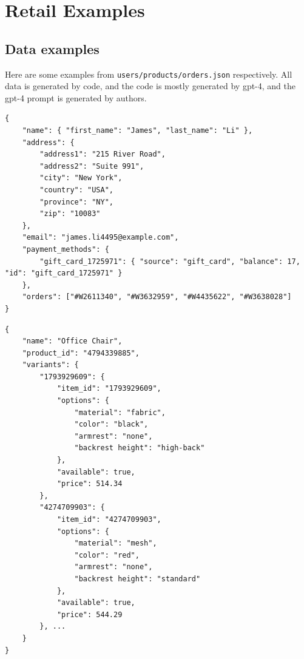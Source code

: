 \newpage 
\section{Retail Examples} \label{sec:retail_details}

\subsection{Data examples} \label{sec:retail_data}
Here are some examples from \texttt{users/products/orders.json} respectively. All data is generated by code, and the code is mostly generated by gpt-4, and the gpt-4 prompt is generated by authors. 

\begin{listing}[ht]
\begin{verbatim}
{
    "name": { "first_name": "James", "last_name": "Li" },
    "address": {
        "address1": "215 River Road",
        "address2": "Suite 991",
        "city": "New York",
        "country": "USA",
        "province": "NY",
        "zip": "10083"
    },
    "email": "james.li4495@example.com",
    "payment_methods": {
        "gift_card_1725971": { "source": "gift_card", "balance": 17, "id": "gift_card_1725971" }
    },
    "orders": ["#W2611340", "#W3632959", "#W4435622", "#W3638028"]
}
\end{verbatim}
\caption{An example entry from users database in \retail.}
\end{listing}




\begin{listing}[ht]
\begin{verbatim}
{
    "name": "Office Chair",
    "product_id": "4794339885",
    "variants": {
        "1793929609": {
            "item_id": "1793929609",
            "options": {
                "material": "fabric",
                "color": "black",
                "armrest": "none",
                "backrest height": "high-back"
            },
            "available": true,
            "price": 514.34
        },
        "4274709903": {
            "item_id": "4274709903",
            "options": {
                "material": "mesh",
                "color": "red",
                "armrest": "none",
                "backrest height": "standard"
            },
            "available": true,
            "price": 544.29
        }, ...
    }
}
\end{verbatim}
\caption{An example entry from products database in \retail{} (more variants omitted).}
\end{listing}



